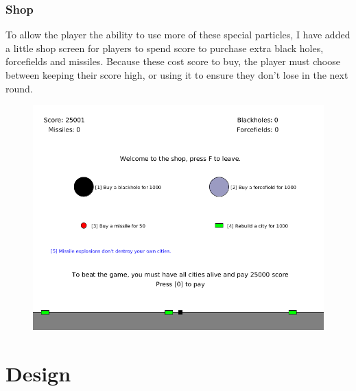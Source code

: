 \documentclass{article}
\begin{document}
\subsubsection*{Shop}
To allow the player the ability to use more of these special particles, I have added a little shop screen for players to spend score to purchase extra black holes, forcefields and missiles. Because these cost score to buy, the player must choose between keeping their score high, or using it to ensure they don't lose in the next round. 
\begin{figure}[H]
\centering
\includegraphics[width=1\textwidth, keepaspectratio]{imgs/Shop.png}
\end{figure}


\section{Design}
\end{document}
